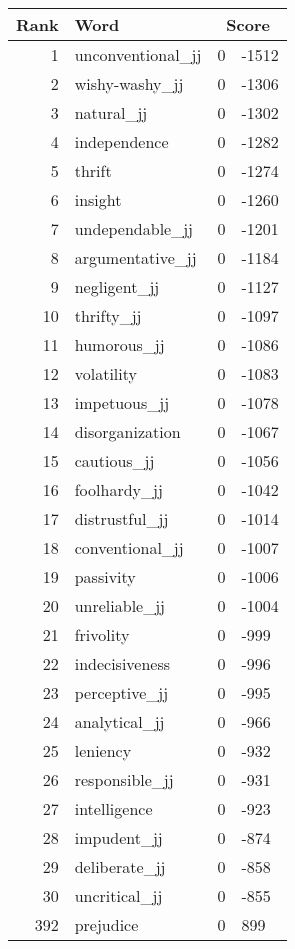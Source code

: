 \begin{longtable}[!htbp]{| rlr@{.}l |}
    \hline
    \textbf{Rank} & \textbf{Word} & \multicolumn{2}{c|}{\textbf{Score}} \\
    \hline
    \endhead
    1 & unconventional\_jj & 0 & -1512 \\
    2 & wishy-washy\_jj & 0 & -1306 \\
    3 & natural\_jj & 0 & -1302 \\
    4 & independence & 0 & -1282 \\
    5 & thrift & 0 & -1274 \\
    6 & insight & 0 & -1260 \\
    7 & undependable\_jj & 0 & -1201 \\
    8 & argumentative\_jj & 0 & -1184 \\
    9 & negligent\_jj & 0 & -1127 \\
    10 & thrifty\_jj & 0 & -1097 \\
    11 & humorous\_jj & 0 & -1086 \\
    12 & volatility & 0 & -1083 \\
    13 & impetuous\_jj & 0 & -1078 \\
    14 & disorganization & 0 & -1067 \\
    15 & cautious\_jj & 0 & -1056 \\
    16 & foolhardy\_jj & 0 & -1042 \\
    17 & distrustful\_jj & 0 & -1014 \\
    18 & conventional\_jj & 0 & -1007 \\
    19 & passivity & 0 & -1006 \\
    20 & unreliable\_jj & 0 & -1004 \\
    21 & frivolity & 0 & -999 \\
    22 & indecisiveness & 0 & -996 \\
    23 & perceptive\_jj & 0 & -995 \\
    24 & analytical\_jj & 0 & -966 \\
    25 & leniency & 0 & -932 \\
    26 & responsible\_jj & 0 & -931 \\
    27 & intelligence & 0 & -923 \\
    28 & impudent\_jj & 0 & -874 \\
    29 & deliberate\_jj & 0 & -858 \\
    30 & uncritical\_jj & 0 & -855 \\
    392 & prejudice & 0 & 899 \\

\end{longtable}
